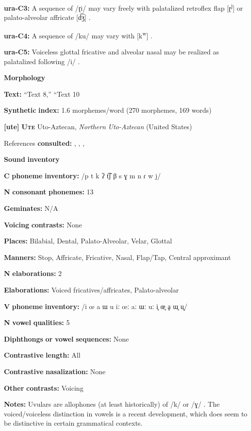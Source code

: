 \begin{styleBody}
\textbf{ura-C3:} A sequence of /ɽi/ may vary freely with palatalized retroflex flap [ɽ\textsuperscript{j}] or palato-alveolar affricate [d͡ʒ] \citep[71]{Olawsky2006}.

\textbf{ura-C4:} A sequence of /ku/ may vary with [k\textsuperscript{w}] \citep[37]{Olawsky2006}.

\textbf{ura-C5:} Voiceless glottal fricative and alveolar nasal may be realized as palatalized following /i/ \citep[47]{Olawsky2006}.

\textbf{Morphology}

\textbf{Text:} “Text 8,” “Text 10 \citep[902-905]{Olawsky2006}

\textbf{Synthetic} \textbf{index:} 1.6 morphemes/word (270 morphemes, 169 words)

\textbf{[ute]}   \textbf{\textsc{Ute}  }  Uto-Aztecan, \textit{Northern} \textit{Uto-Aztecan} (United States)

References \textbf{consulted:} \citet{Givón2011}, \citet{Givón2013}, \citet{Harms1966}, \citet{Oberly2013}

\textbf{Sound} \textbf{inventory}

\textbf{C} \textbf{phoneme} \textbf{inventory:} /p t k ʔ t͡ʃ β s ɣ m n ɾ w j/

\textbf{N} \textbf{consonant} \textbf{phonemes:} 13

\textbf{Geminates:} N/A

\textbf{Voicing} \textbf{contrasts:} None

\textbf{Places:} Bilabial, Dental, Palato-Alveolar, Velar, Glottal

\textbf{Manners:} Stop, Affricate, Fricative, Nasal, Flap/Tap, Central approximant

\textbf{N} \textbf{elaborations:} 2

\textbf{Elaborations:} Voiced fricatives/affricates, Palato-alveolar

\textbf{V} \textbf{phoneme} \textbf{inventory:} /i œ a ɯ u iː œː aː ɯː uː i̥ œ̥ ḁ ɯ̥ u̥/

\textbf{N} \textbf{vowel} \textbf{qualities:} 5

\textbf{Diphthongs} \textbf{or} \textbf{vowel} \textbf{sequences:} None

\textbf{Contrastive} \textbf{length:} All

\textbf{Contrastive} \textbf{nasalization:} None

\textbf{Other} \textbf{contrasts:} Voicing

\textbf{Notes:} Uvulars are allophones (at least historically) of /k/ or /ɣ/ \citep[26]{Givón2011}. The voiced/voiceless distinction in vowels is a recent development, which does seem to be distinctive in certain grammatical contexts.


\end{styleBody}
